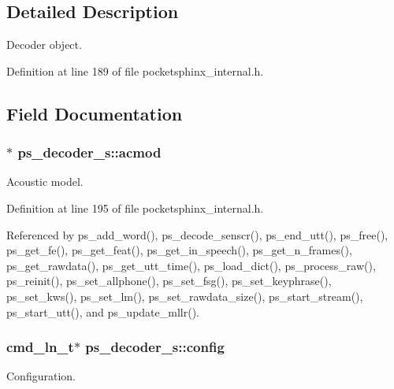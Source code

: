 \subsection{Detailed Description}
Decoder object. 

Definition at line 189 of file pocketsphinx\+\_\+internal.\+h.



\subsection{Field Documentation}
\subsubsection[{acmod}]{$\ast$ ps\+\_\+decoder\+\_\+s\+::acmod}\label{structps__decoder__s_af834d2bc1d44c1d9ef607b025413a0b8}


Acoustic model. 



Definition at line 195 of file pocketsphinx\+\_\+internal.\+h.



Referenced by ps\+\_\+add\+\_\+word(), ps\+\_\+decode\+\_\+senscr(), ps\+\_\+end\+\_\+utt(), ps\+\_\+free(), ps\+\_\+get\+\_\+fe(), ps\+\_\+get\+\_\+feat(), ps\+\_\+get\+\_\+in\+\_\+speech(), ps\+\_\+get\+\_\+n\+\_\+frames(), ps\+\_\+get\+\_\+rawdata(), ps\+\_\+get\+\_\+utt\+\_\+time(), ps\+\_\+load\+\_\+dict(), ps\+\_\+process\+\_\+raw(), ps\+\_\+reinit(), ps\+\_\+set\+\_\+allphone(), ps\+\_\+set\+\_\+fsg(), ps\+\_\+set\+\_\+keyphrase(), ps\+\_\+set\+\_\+kws(), ps\+\_\+set\+\_\+lm(), ps\+\_\+set\+\_\+rawdata\+\_\+size(), ps\+\_\+start\+\_\+stream(), ps\+\_\+start\+\_\+utt(), and ps\+\_\+update\+\_\+mllr().

\subsubsection[{config}]{\setlength{\rightskip}{0pt plus 5cm}cmd\+\_\+ln\+\_\+t$\ast$ ps\+\_\+decoder\+\_\+s\+::config}\label{structps__decoder__s_a0565ed97b32408bd05c8104f020cef05}


Configuration. 



